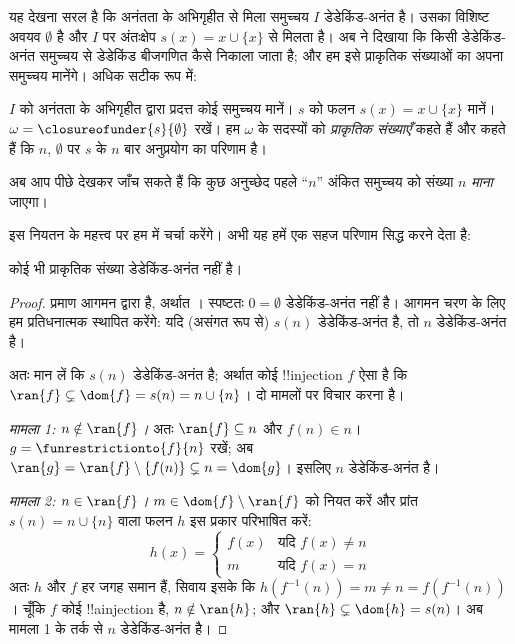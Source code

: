\documentclass[../../../include/open-logic-section]{subfiles}
\begin{document}
यह देखना सरल है कि अनंतता के अभिगृहीत से मिला समुच्चय $I$ डेडेकिंड-अनंत
है। उसका विशिष्ट अवयव $\emptyset$ है और $I$ पर अंतःक्षेप
$s(x) = x\cup \{x\}$ से मिलता है। अब
 ने दिखाया कि
किसी डेडेकिंड-अनंत समुच्चय से डेडेकिंड बीजगणित कैसे निकाला जाता है; और हम
इसे प्राकृतिक संख्याओं का अपना समुच्चय मानेंगे। अधिक सटीक रूप में:
\begin{defn}
$I$ को अनंतता के अभिगृहीत द्वारा प्रदत्त कोई समुच्चय मानें। $s$ को फलन
$s(x) = x \cup \{x\}$ मानें। $\omega = \closureofunder{s}{\emptyset}$
रखें। हम $\omega$ के सदस्यों को \emph{प्राकृतिक संख्याएँ} कहते हैं और कहते
हैं कि $n$, $\emptyset$ पर $s$ के $n$ बार अनुप्रयोग का परिणाम है।
\end{defn}

अब आप पीछे देखकर जाँच सकते हैं कि कुछ अनुच्छेद पहले ``$n$'' अंकित समुच्चय
को संख्या $n$ \emph{माना} जाएगा।

इस नियतन के महत्त्व पर हम  में चर्चा करेंगे। अभी
यह हमें एक सहज परिणाम सिद्ध करने देता है:

\begin{prop}
कोई भी प्राकृतिक संख्या डेडेकिंड-अनंत नहीं है।
\end{prop}

\begin{proof}
प्रमाण आगमन द्वारा है, अर्थात
। स्पष्टतः
$0 = \emptyset$ डेडेकिंड-अनंत नहीं है। आगमन चरण के लिए हम प्रतिधनात्मक
स्थापित करेंगे: यदि (असंगत रूप से) $s(n)$ डेडेकिंड-अनंत है, तो $n$
डेडेकिंड-अनंत है।

अतः मान लें कि $s(n)$ डेडेकिंड-अनंत है; अर्थात कोई !!{injection} $f$ ऐसा
है कि $\ran{f}\subsetneq \dom{f} = s(n) = n \cup \{n\}$। दो मामलों पर
विचार करना है।

\emph{मामला 1: $n \notin \ran{f}$।} अतः $\ran{f} \subseteq n$ और
$f(n) \in n$। $g = \funrestrictionto{f}{n}$ रखें; अब
$\ran{g} = \ran{f} \setminus \{f(n)\} \subsetneq n = \dom{g}$। इसलिए
$n$ डेडेकिंड-अनंत है।

\emph{मामला 2: $n \in \ran{f}$।}
$m \in \dom{f} \setminus \ran{f}$ को नियत करें और प्रांत
$s(n) = n \cup \{n\}$ वाला फलन $h$ इस प्रकार परिभाषित करें:
\[
h(x) = 
	\begin{cases}
		f(x) & \text{यदि }f(x) \neq n\\
		m & \text{यदि }f(x)=n
	\end{cases}
\]
अतः $h$ और $f$ हर जगह समान हैं, सिवाय इसके कि
$h(f^{-1}(n)) = m \neq n = f(f^{-1}(n))$। चूँकि $f$ कोई !!a{injection}
है, $n \notin \ran{h}$; और $\ran{h} \subsetneq \dom{h} = s(n)$। अब
मामला 1 के तर्क से $n$ डेडेकिंड-अनंत है।
\end{proof}
\end{document}
